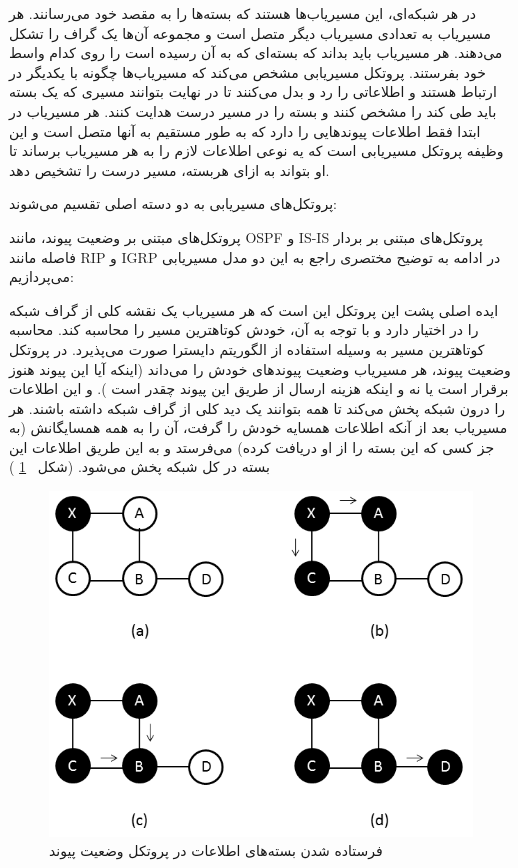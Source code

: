 
در هر شبکه‌ای، این مسیریاب‌ها هستند که بسته‌ها را به مقصد خود می‌رسانند. هر مسیریاب به تعدادی مسیریاب دیگر متصل است و مجموعه آن‌ها یک گراف را تشکل می‌دهند. هر مسیریاب باید بداند که بسته‌ای که به آن رسیده است را روی کدام واسط خود بفرستند. 
پروتکل مسیریابی مشخص می‌کند که مسیریاب‌ها چگونه با یکدیگر در ارتباط‌‌ هستند و اطلاعاتی را رد و بدل می‌کنند تا در نهایت بتوانند مسیری که یک بسته باید طی کند را مشخص کنند و بسته را در مسیر درست هدایت کنند. هر مسیریاب در ابتدا فقط اطلاعات پیوندهایی را دارد که به طور مستقیم به آنها متصل است و این وظیفه پروتکل مسیریابی است که یه نوعی اطلاعات لازم را به هر مسیریاب برساند تا او بتواند به ازای هربسته، مسیر درست را تشخیص دهد. 

پروتکل‌های مسیریابی به دو دسته اصلی تقسیم می‌شوند:‌

 پروتکل‌های مبتنی بر وضعیت پیوند، مانند OSPF
و
 IS-IS
 پروتکل‌های مبتنی بر بردار فاصله مانند RIP
و IGRP
 در ادامه به توضیح مختصری راجع به این دو مدل مسیریابی می‌پردازیم:
 
 ایده اصلی پشت این پروتکل این است که هر مسیریاب یک نقشه کلی از گراف شبکه را در اختیار دارد و با توجه به آن، خودش کوتاهترین مسیر را محاسبه کند. محاسبه کوتاهترین مسیر به وسیله استفاده از الگوریتم دایسترا صورت می‌پذیرد. در پروتکل وضعیت پیوند، هر مسیریاب وضعیت پیوند‌های خودش را می‌داند (‌اینکه آیا این پیوند هنوز برقرار است یا نه و اینکه هزینه ارسال از طریق این پیوند چقدر است ). و این اطلاعات را درون شبکه پخش می‌کند تا همه بتوانند یک دید کلی از گراف شبکه داشته باشند. هر مسیریاب بعد از آنکه اطلاعات همسایه خودش را گرفت، آن را به همه همسایگانش (‌به جز کسی که این بسته را از او دریافت کرده)‌ می‌فرستد و به این طریق اطلاعات این بسته در کل شبکه پخش می‌شود. (‌شکل 
~\ref{fig:linkstate}
 )
 \begin{figure}[H]
\centering
\includegraphics[scale=0.8]{./resources/figures/linkstate.png}
\caption{فرستاده شدن بسته‌‌های اطلاعات در پروتکل وضعیت پیوند}
\label{fig:linkstate}
\end{figure}
 
